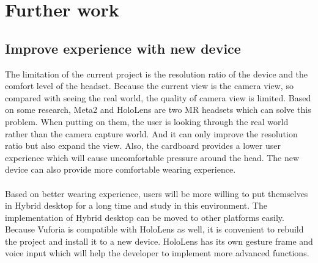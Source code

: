 
\chapter{Further work} %

\label{Chapter8} %
\section{Improve experience with new device}
The limitation of the current project is the resolution ratio of the device and the comfort level of the headset. Because the current view is the camera view, so compared with seeing the real world, the quality of camera view is limited. Based on some research, Meta2 and HoloLens are two MR headsets which can solve this problem. When putting on them, the user is looking through the real world rather than the camera capture world. And it can only improve the resolution ratio but also expand the view. Also, the cardboard provides a lower user experience which will cause uncomfortable pressure around the head. The new device can also provide more comfortable wearing experience. 
\\
\\
Based on better wearing experience, users will be more willing to put themselves in Hybrid desktop for a long time and study in this environment. The implementation of Hybrid desktop can be moved to other platforms easily. Because Vuforia is compatible with HoloLens as well, it is convenient to rebuild the project and install it to a new device. HoloLens has its own gesture frame and voice input which will help the developer to implement more advanced functions.

